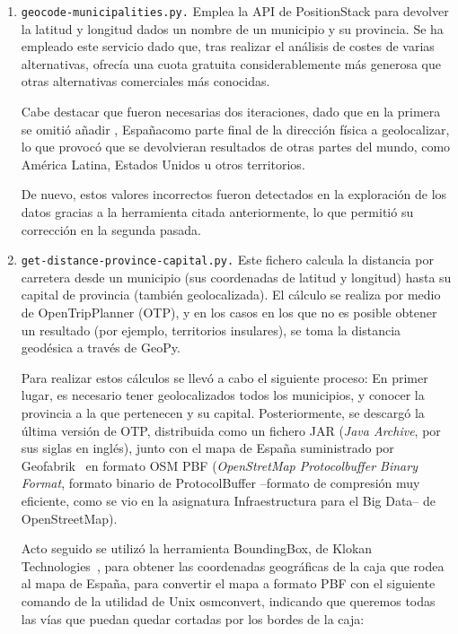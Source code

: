 \begin{enumerate}
    \item \texttt{geocode-municipalities.py.} Emplea la API de PositionStack para devolver la latitud y longitud dados un nombre de un municipio y su provincia. Se ha empleado este servicio dado que, tras realizar el análisis de costes de varias alternativas, ofrecía una cuota gratuita considerablemente más generosa que otras alternativas comerciales más conocidas.
    
    Cabe destacar que fueron necesarias dos iteraciones, dado que en la primera se omitió añadir \guillemotleft , España\guillemotright\space como parte final de la dirección física a geolocalizar, lo que provocó que se devolvieran resultados de otras partes del mundo, como América Latina, Estados Unidos u otros territorios.


    De nuevo, estos valores incorrectos fueron detectados en la exploración de los datos gracias a la herramienta citada anteriormente, lo que permitió su corrección en la segunda pasada.
    
    \item \texttt{get-distance-province-capital.py.} Este fichero calcula la distancia por carretera desde un municipio (sus coordenadas de latitud y longitud) hasta su capital de provincia (también geolocalizada). El cálculo se realiza por medio de OpenTripPlanner (OTP), y en los casos en los que no es posible obtener un resultado (por ejemplo, territorios insulares), se toma la distancia geodésica a través de GeoPy.

    Para realizar estos cálculos se llevó a cabo el siguiente proceso: En primer lugar, es necesario tener geolocalizados todos los municipios, y conocer la provincia a la que pertenecen y su capital. Posteriormente, se descargó la última versión de OTP, distribuida como un fichero JAR (\textit{Java Archive}, por sus siglas en inglés), junto con el mapa de España suministrado por Geofabrik~\cite{spain_map} en formato OSM PBF (\textit{OpenStretMap Protocolbuffer Binary Format}, formato binario de ProtocolBuffer –formato de compresión muy eficiente, como se vio en la asignatura \guillemotleft Infraestructura para el Big Data\guillemotright\space– de OpenStreetMap).

    Acto seguido se utilizó la herramienta BoundingBox, de Klokan Technologies~\cite{klokan}, para obtener las coordenadas geográficas de la caja que rodea al mapa de España, para convertir el mapa a formato PBF con el siguiente comando de la utilidad de Unix osmconvert, indicando que queremos todas las vías que puedan quedar cortadas por los bordes de la caja:


\end{enumerate}
